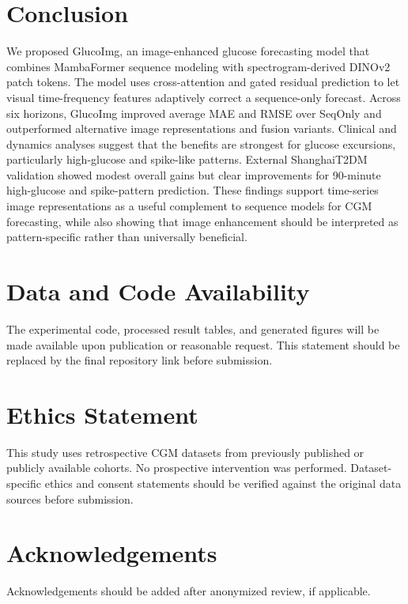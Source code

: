 \documentclass[11pt]{article}
\begin{document}
\section{Conclusion}

We proposed GlucoImg, an image-enhanced glucose forecasting model that combines MambaFormer sequence modeling with spectrogram-derived DINOv2 patch tokens. The model uses cross-attention and gated residual prediction to let visual time-frequency features adaptively correct a sequence-only forecast. Across six horizons, GlucoImg improved average MAE and RMSE over SeqOnly and outperformed alternative image representations and fusion variants. Clinical and dynamics analyses suggest that the benefits are strongest for glucose excursions, particularly high-glucose and spike-like patterns. External ShanghaiT2DM validation showed modest overall gains but clear improvements for 90-minute high-glucose and spike-pattern prediction. These findings support time-series image representations as a useful complement to sequence models for CGM forecasting, while also showing that image enhancement should be interpreted as pattern-specific rather than universally beneficial.

\section*{Data and Code Availability}

The experimental code, processed result tables, and generated figures will be made available upon publication or reasonable request. This statement should be replaced by the final repository link before submission.

\section*{Ethics Statement}

This study uses retrospective CGM datasets from previously published or publicly available cohorts. No prospective intervention was performed. Dataset-specific ethics and consent statements should be verified against the original data sources before submission.

\section*{Acknowledgements}

Acknowledgements should be added after anonymized review, if applicable.
\end{document}
